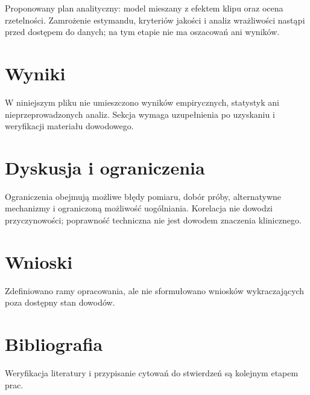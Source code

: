 \documentclass[11pt,a4paper]{article}
\begin{document}
Proponowany plan analityczny: model mieszany z efektem klipu oraz ocena rzetelności. Zamrożenie estymandu, kryteriów jakości i analiz wrażliwości nastąpi przed dostępem do danych; na tym etapie nie ma oszacowań ani wyników.

\section{Wyniki}

W niniejszym pliku nie umieszczono wyników empirycznych, statystyk ani nieprzeprowadzonych analiz. Sekcja wymaga uzupełnienia po uzyskaniu i weryfikacji materiału dowodowego.

\section{Dyskusja i ograniczenia}

Ograniczenia obejmują możliwe błędy pomiaru, dobór próby, alternatywne mechanizmy i ograniczoną możliwość uogólniania. Korelacja nie dowodzi przyczynowości; poprawność techniczna nie jest dowodem znaczenia klinicznego.

\section{Wnioski}

Zdefiniowano ramy opracowania, ale nie sformułowano wniosków wykraczających poza dostępny stan dowodów.

\section*{Bibliografia}

Weryfikacja literatury i przypisanie cytowań do stwierdzeń są kolejnym etapem prac.
\end{document}
